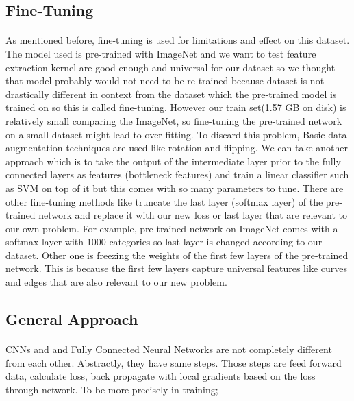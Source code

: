 \subsection{Fine-Tuning}

\paragraph{}As mentioned before, fine-tuning is used for limitations and effect on this dataset.  The model used is pre-trained with ImageNet and we want to test feature extraction kernel are good enough and universal for our dataset so we thought that model probably would not need to be re-trained because dataset is not drastically different in context from the dataset which the pre-trained model is trained on so this is called fine-tuning. However our train set(1.57 GB on disk) is relatively small comparing the ImageNet, so fine-tuning the pre-trained network on a small dataset might lead to over-fitting. To discard this problem, Basic data augmentation techniques are used like rotation and flipping. We can take another approach which is to take the output of the intermediate layer prior to the fully connected layers as features (bottleneck features) and train a linear classifier such as SVM on top of it but this comes with so many parameters to tune. There are other fine-tuning methods like truncate the last layer (softmax layer) of the pre-trained network and replace it with our new loss or last layer that are relevant to our own problem. For example, pre-trained network on ImageNet comes with a softmax layer with 1000 categories so last layer is changed according to our dataset. Other one is freezing the weights of the first few layers of the pre-trained network. This is because the first few layers capture universal features like curves and edges that are also relevant to our new problem.
\subsection{General Approach}
\paragraph{} CNNs and and Fully Connected Neural Networks are not completely different from each other. Abstractly, they have same steps. Those steps are feed forward data, calculate loss, back propagate with local gradients based on the loss through network. To be more precisely in training;

